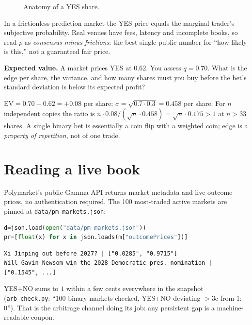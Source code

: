 \begin{figure}[htbp]\centering

\caption{Anatomy of a YES share.}
\label{fig:contract}
\end{figure}

\begin{principle}
In a frictionless prediction market the YES price equals the marginal trader's subjective
probability. Real venues have fees, latency and incomplete books, so read $p$ as
\emph{consensus-minus-frictions}: the best single public number for ``how likely is this,''
not a guaranteed fair price.
\end{principle}

\begin{example}\label{ex:pmev}
\textbf{Expected value.} A market prices YES at $0.62$. You assess $q=0.70$. What is the edge
per share, the variance, and how many shares must you buy before the bet's standard deviation
is below its expected profit?
\begin{solution}
$\mathrm{EV}=0.70-0.62=+0.08$ per share; $\sigma=\sqrt{0.7\cdot0.3}=0.458$ per share. For $n$
independent copies the ratio is $n\cdot0.08/(\sqrt{n}\cdot0.458)=\sqrt{n}\cdot0.175>1$ at
$n>33$ shares. A single binary bet is essentially a coin flip with a weighted coin; edge is a
\emph{property of repetition}, not of one trade.
\end{solution}
\end{example}

\section{Reading a live book}\label{sec:pmlive}

Polymarket's public Gamma API returns market metadata and live outcome prices, no
authentication required. The 100 most-traded active markets are pinned at
\texttt{data/pm\_markets.json}:

\begin{lstlisting}[language=Python, numbers=none]
d=json.load(open("data/pm_markets.json"))
pr=[float(x) for x in json.loads(m["outcomePrices"])]
\end{lstlisting}
\begin{lstlisting}[numbers=none]
Xi Jinping out before 2027? | ["0.0285", "0.9715"]
Will Gavin Newsom win the 2028 Democratic pres. nomination | ["0.1545", ...]
\end{lstlisting}

YES$+$NO sums to $1$ within a few cents everywhere in the snapshot
(\texttt{arb\_check.py}: ``100 binary markets checked, YES+NO deviating $>$3c from 1: 0'').
That is the arbitrage channel doing its job: any persistent gap is a machine-readable coupon.

